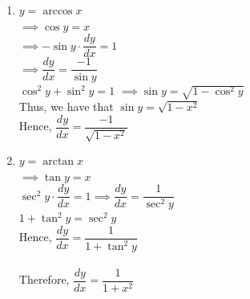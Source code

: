 \documentclass[11pt,a4paper]{article}
\begin{document}
\begin{enumerate}
\item $y=\arccos x$\\

$\implies \cos y =x$\\

$\implies -\sin y\cdot \dfrac{dy}{dx}=1$\\

$\implies \dfrac{dy}{dx}=\dfrac{-1}{\sin y}$\\

$\cos^2y +\sin^2y=1$ \hspace{0.3cm}$\implies \sin y =\sqrt{1-\cos ^2y}$\\


Thus, we have that $\sin y =\sqrt{1-x^2}$\\

Hence, $\dfrac{dy}{dx}=\dfrac{-1}{\sqrt{1-x^2}}$\\


\item $y=\arctan x$\\

$\implies \tan y=x$\\

$\sec^2y\cdot \dfrac{dy}{dx}=1\implies \dfrac{dy}{dx}=\dfrac{1}{\sec^2y}$\\

$1+\tan^2y=\sec^2y$\\

Hence, $\dfrac{dy}{dx}=\dfrac{1}{1+\tan^2y}$\\\\


Therefore, $\dfrac{dy}{dx}=\dfrac{1}{1+x^2}$\\
\end{enumerate}
\end{document}
